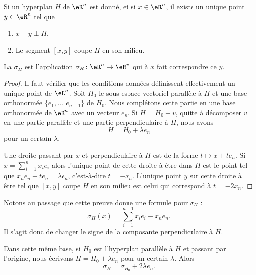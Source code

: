 \begin{lemmaDef}
	Si un hyperplan \( H\) de \( \eR^n\) est donné, et si \( x\in \eR^n\), il existe un unique point \( y\in \eR^n\) tel que
	\begin{enumerate}
		\item
		      \( x-y\perp H\),
		\item
		      Le segment \( [x,y]\) coupe \( H\) en son milieu.
	\end{enumerate}
	La  \( \sigma_H\) est l'application $\sigma_H\colon \eR^n\to \eR^n $ qui à \( x\) fait correspondre ce \( y\).
\end{lemmaDef}

\begin{proof}
	Il faut vérifier que les conditions données définissent effectivement un unique point de \( \eR^n\). Soit \( H_0\) le sous-espace vectoriel parallèle à \( H\) et une base orthonormée \( \{ e_1,\ldots, e_{n-1} \}\) de \( H_0\). Nous complétons cette partie en une base orthonormée de \( \eR^n\) avec un vecteur \( e_n\). Si \( H=H_0+v\), quitte à décomposer \( v\) en une partie parallèle et une partie perpendiculaire à \( H\), nous avons
	\begin{equation}
		H=H_0+\lambda e_n
	\end{equation}
	pour un certain \( \lambda\).

	Une droite passant par \( x\) et perpendiculaire à \( H\) est de la forme \( t\mapsto x+te_n\). Si \( x=\sum_{i=1}^{n}x_ie_i\) alors l'unique point de cette droite à être dans \( H\) est le point tel que \(   x_ne_n+te_n=\lambda e_n   \), c'est-à-dire \( t=-x_n\). L'unique point \( y\) sur cette droite à être tel que \( [x,y ]\) coupe \( H\) en son milieu est celui qui correspond à \( t=-2x_n\).
\end{proof}

Notons au passage que cette preuve donne une formule pour \( \sigma_H\) :
\begin{equation}        \label{EQooRTWLooLPsUpY}
	\sigma_H(x)=\sum_{i=1}^{n-1}x_ie_i-x_ne_n.
\end{equation}
Il s'agit donc de changer le signe de la composante perpendiculaire à \( H\).

\begin{lemma}       \label{LEMooWYVRooQmWqvM}
	Dans cette même base, si \( H_0\) est l'hyperplan parallèle à \( H\) et passant par l'origine, nous écrivons \( H=H_0+\lambda e_n\) pour un certain \( \lambda\). Alors
	\begin{equation}
		\sigma_H=\sigma_{H_0}+2\lambda e_n.
	\end{equation}
\end{lemma}


